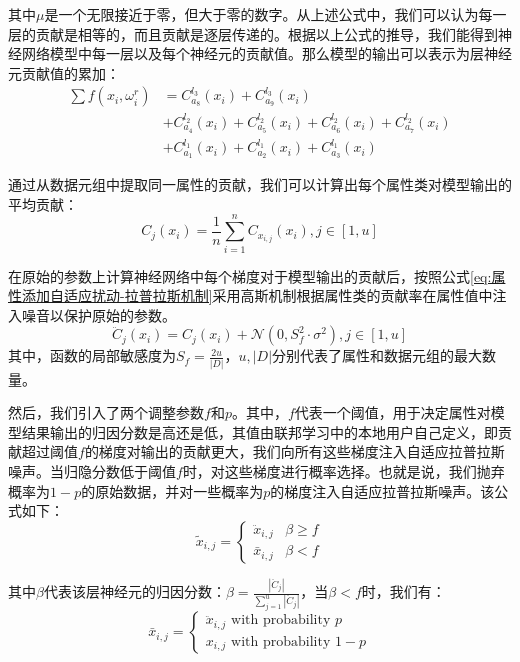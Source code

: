 其中$\mu$是一个无限接近于零，但大于零的数字。从上述公式中，我们可以认为每一层的贡献是相等的，而且贡献是逐层传递的。根据以上公式的推导，我们能得到神经网络模型中每一层以及每个神经元的贡献值。那么模型的输出可以表示为层神经元贡献值的累加：
$$
\begin{aligned}
\sum f\left(x_{i}, \omega_{i}^{r}\right) &=C_{a_{8}}^{l_{3}}\left(x_{i}\right)+C_{a_{9}}^{l_{3}}\left(x_{i}\right)\\
&+C_{a_{4}}^{l_{2}}\left(x_{i}\right)+C_{a_{5}}^{l_{2}}\left(x_{i}\right)+C_{a_{6}}^{l_{2}}\left(x_{i}\right)+C_{a_{7}}^{l_{2}}\left(x_{i}\right)\\
&+C_{a_{1}}^{l_{1}}\left(x_{i}\right)+C_{a_{2}}^{l_{1}}\left(x_{i}\right)+C_{a_{3}}^{l_{1}}\left(x_{i}\right)
\end{aligned}
$$

通过从数据元组中提取同一属性的贡献，我们可以计算出每个属性类对模型输出的平均贡献：
\begin{equation}\label{eq:属性添加自适应扰动}
C_{j}\left(x_{i}\right)=\frac{1}{n} \sum_{i=1}^{n} C_{x_{i, j}}\left(x_{i}\right), j \in[1, u]
\end{equation}

在原始的参数上计算神经网络中每个梯度对于模型输出的贡献后，按照公式\ref{eq:属性添加自适应扰动-拉普拉斯机制}采用高斯机制根据属性类的贡献率在属性值中注入噪音以保护原始的参数。
\begin{equation}\label{eq:属性添加自适应扰动-拉普拉斯机制}
\ddot{C}_{j}\left(x_{i}\right)=C_{j}\left(x_{i}\right)+\mathcal{N}\left(0, S_{f}^{2} \cdot \sigma^{2}\right), j \in[1, u]
\end{equation}
其中，函数的局部敏感度为$S_{f}=\frac{2 u}{|D|}$，$u,|D|$分别代表了属性和数据元组的最大数量。

然后，我们引入了两个调整参数$f$和$p$。其中，$f$代表一个阈值，用于决定属性对模型结果输出的归因分数是高还是低，其值由联邦学习中的本地用户自己定义，即贡献超过阈值$f$的梯度对输出的贡献更大，我们向所有这些梯度注入自适应拉普拉斯噪声。当归隐分数低于阈值$f$时，对这些梯度进行概率选择。也就是说，我们抛弃概率为$1-p$的原始数据，并对一些概率为$p$的梯度注入自适应拉普拉斯噪声。该公式如下：
\begin{equation}\label{eq:神经网络加噪}
\tilde{x}_{i, j}=\left\{\begin{array}{ll}
\ddot{x}_{i, j} & \beta \geq f \\
\bar{x}_{i, j} & \beta<f
\end{array}\right.
\end{equation}

其中$\beta$代表该层神经元的归因分数：$\beta=\frac{\left|\ddot{C}_{j}\right|}{\sum_{j=1}^{u}\left|\ddot{C}_{j}\right|}$，当$\beta<f$时，我们有：
\begin{equation}\label{eq:神经网络加噪2}
\bar{x}_{i, j}=\left\{\begin{array}{l}
\ddot{x}_{i, j} \text { with probability } p \\
x_{i, j} \text { with probability } 1-p
\end{array}\right.
\end{equation}

